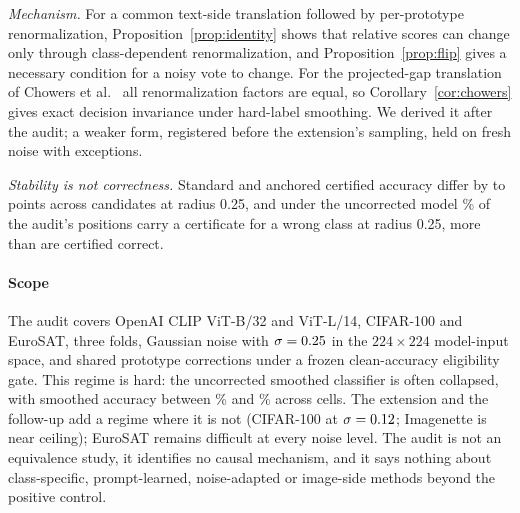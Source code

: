 \emph{Mechanism.} For a common text-side translation followed by
per-prototype renormalization, Proposition~\ref{prop:identity} shows that
relative scores can change only through class-dependent renormalization, and
Proposition~\ref{prop:flip} gives a necessary condition for a noisy vote to
change. For the projected-gap translation of Chowers et
al.~\cite{chowers2026bug} all renormalization factors are equal, so
Corollary~\ref{cor:chowers} gives exact decision invariance under hard-label
smoothing. We derived it after the
audit; a weaker form, registered before the extension's sampling, held on fresh
noise with \NthreeCPone{} exceptions.

\emph{Stability is not correctness.} Standard and anchored certified accuracy
differ by \StdAnchGapMin{} to \StdAnchGapMax{} points across candidates at radius 0.25, and
under the uncorrected model \CertifiedWrongRate\% of the audit's positions carry
a certificate for a wrong class at radius 0.25, more than are certified
correct.

\paragraph{Scope}
The audit covers OpenAI CLIP ViT-B/32 and ViT-L/14, CIFAR-100 and
EuroSAT, three folds, Gaussian noise with $\sigma=0.25$ in the
$224\times224$ model-input space, and shared prototype corrections under a
frozen clean-accuracy eligibility gate. This regime is hard: the
uncorrected smoothed classifier is often collapsed, with smoothed accuracy
between \RangeSmoothedLo\% and \RangeSmoothedHi\% across cells. The extension and
the follow-up add a regime where it is not (CIFAR-100 at $\sigma=0.12$;
Imagenette is near ceiling); EuroSAT remains difficult at every noise level. The audit is not
an equivalence study, it identifies no causal mechanism, and it says nothing
about class-specific, prompt-learned, noise-adapted or image-side methods beyond
the positive control.
